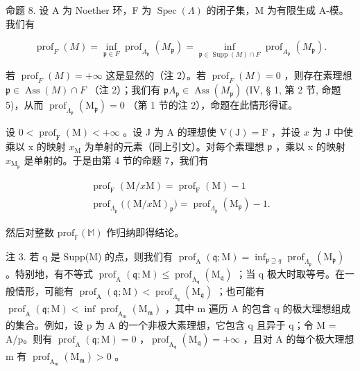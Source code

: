 命题 8. 设 A 为 Noether 环，F 为 \(\operatorname{Spec}(\Lambda)\) 的闭子集，M 为有限生成 A-模。我们有

\[
\operatorname{prof} _ {F} (M) = \inf _ {\mathfrak {p} \in F} \operatorname{prof} _ {A _ {\mathfrak {p}}} \left(M _ {\mathfrak {p}}\right) = \inf _ {\mathfrak {p} \in \operatorname{Supp} (M) \cap F} \operatorname{prof} _ {A _ {\mathfrak {p}}} \left(M _ {\mathfrak {p}}\right).
\]

若 \(\operatorname{prof}_{F}(M) = +\infty\) 这是显然的（注 2）。若 \(\operatorname{prof}_{F}(M) = 0\) ，则存在素理想 \(\mathfrak{p} \in \operatorname{Ass}(M) \cap F\) （注 2）；我们有 \(\mathfrak{p}A_{\mathfrak{p}} \in \operatorname{Ass}(M_{\mathfrak{p}})\) (IV, § 1, 第 2 节, 命题 5)，从而 \(\operatorname{prof}_{\Lambda_{\mathfrak{p}}}(\mathrm{M}_{\mathfrak{p}}) = 0\) （第 1 节的注 2），命题在此情形得证。

设 \(0 < \operatorname{prof}_{\mathrm{F}}(\mathrm{M}) < +\infty\) 。设 J 为 A 的理想使 \(\mathrm{V}(\mathrm{J}) = \mathrm{F}\) ，并设 \(x\) 为 J 中使乘以 x 的映射 \(x_{\mathrm{M}}\) 为单射的元素（同上引文）。对每个素理想 \(\mathfrak{p}\) ，乘以 x 的映射 \(x_{\mathrm{M}_{\mathfrak{p}}}\) 是单射的。于是由第 4 节的命题 7，我们有

\[
\begin{array}{c} \operatorname{prof} _ {\mathrm{F}} (\mathrm{M} / x \mathrm{M}) = \operatorname{prof} _ {\mathrm{F}} (\mathrm{M}) - 1 \\ \operatorname{prof} _ {\Lambda_ {\mathfrak {p}}} \big ((\mathrm{M} / x \mathrm{M}) _ {\mathfrak {p}} \big) = \operatorname{prof} _ {\Lambda_ {\mathfrak {p}}} (\mathrm{M} _ {\mathfrak {p}}) - 1. \end{array}
\]

然后对整数 \(\mathrm{prof}_{\mathbb{F}}(\mathbb{M})\) 作归纳即得结论。

注 3. 若 q 是 Supp(M) 的点，则我们有 \(\operatorname{prof}_{\mathrm{A}}(\mathfrak{q};\mathrm{M}) = \inf_{\mathfrak{p}\supseteq q} \operatorname{prof}_{\Lambda_{\mathfrak{p}}}(\mathrm{M}_{\mathfrak{p}})\) 。特别地，有不等式 \(\operatorname{prof}_{\mathrm{A}}(\mathfrak{q};\mathrm{M}) \leqslant \operatorname{prof}_{\mathrm{A}_{\mathfrak{q}}}(\mathrm{M}_{\mathfrak{q}})\) ；当 q 极大时取等号。在一般情形，可能有 \(\operatorname{prof}_{\mathrm{A}}(\mathfrak{q};\mathrm{M}) < \operatorname{prof}_{\Lambda_{\mathfrak{q}}}(\mathrm{M}_{\mathfrak{q}})\) ；也可能有 \(\operatorname{prof}_{\mathrm{A}}(\mathfrak{q};\mathrm{M}) < \inf \operatorname{prof}_{\mathrm{A}_{\mathfrak{m}}}(\mathrm{M}_{\mathfrak{m}})\) ，其中 m 遍历 A 的包含 q 的极大理想组成的集合。例如，设 p 为 A 的一个非极大素理想，它包含 q 且异于 q；令 M = A/p。则有 \(\operatorname{prof}_{\mathrm{A}}(\mathfrak{q};\mathrm{M}) = 0\) ，\(\operatorname{prof}_{\mathrm{A}_{\mathfrak{q}}}(\mathrm{M}_{\mathfrak{q}}) = +\infty\) ，且对 A 的每个极大理想 m 有 \(\operatorname{prof}_{\mathrm{A}_{\mathfrak{m}}}(\mathrm{M}_{\mathfrak{m}}) > 0\) 。

